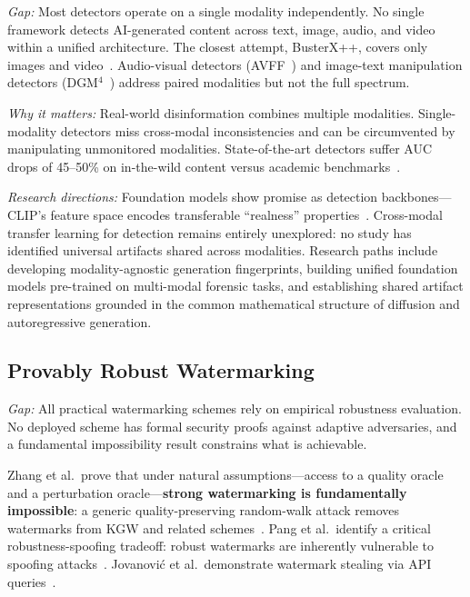 \emph{Gap:} Most detectors operate on a single modality independently. No single framework detects AI-generated content across text, image, audio, and video within a unified architecture. The closest attempt, BusterX++, covers only images and video~\cite{wen2025busterx}. Audio-visual detectors (AVFF~\cite{oorloff2024avff}) and image-text manipulation detectors (DGM$^4$~\cite{shao2023dgm4}) address paired modalities but not the full spectrum.

\emph{Why it matters:} Real-world disinformation combines multiple modalities. Single-modality detectors miss cross-modal inconsistencies and can be circumvented by manipulating unmonitored modalities. State-of-the-art detectors suffer AUC drops of 45--50\% on in-the-wild content versus academic benchmarks~\cite{chandra2025deepfakeeval}.

\emph{Research directions:} Foundation models show promise as detection backbones---CLIP's feature space encodes transferable ``realness'' properties~\cite{ojha2023univfd}. Cross-modal transfer learning for detection remains entirely unexplored: no study has identified universal artifacts shared across modalities. Research paths include developing modality-agnostic generation fingerprints, building unified foundation models pre-trained on multi-modal forensic tasks, and establishing shared artifact representations grounded in the common mathematical structure of diffusion and autoregressive generation.


\subsection{Provably Robust Watermarking}
\label{sec:future-watermark}

\emph{Gap:} All practical watermarking schemes rely on empirical robustness evaluation. No deployed scheme has formal security proofs against adaptive adversaries, and a fundamental impossibility result constrains what is achievable.

Zhang et al.\ prove that under natural assumptions---access to a quality oracle and a perturbation oracle---\textbf{strong watermarking is fundamentally impossible}: a generic quality-preserving random-walk attack removes watermarks from KGW and related schemes~\cite{zhang2024impossibility}. Pang et al.\ identify a critical robustness-spoofing tradeoff: robust watermarks are inherently vulnerable to spoofing attacks~\cite{pang2024nofree}. Jovanovi\'c et al.\ demonstrate watermark stealing via API queries~\cite{jovanovic2024stealing}.

